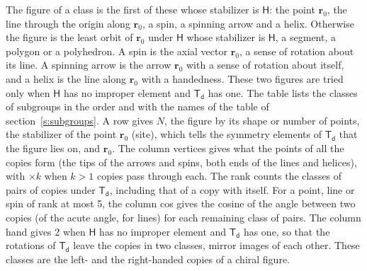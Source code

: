 \documentclass[10pt,a4paper]{article}
\numberwithin{equation}{section}
\newcommand{\grp}[1]{\mathsf{#1}}
\newcommand{\pointr}{\mathbf{r}}
\begin{document}
\leavevmode\label{n:head.figure}The figure of a class is the first of these whose stabilizer is $\grp{H}$: the point $\pointr_0$, the line through the origin along $\pointr_0$, a spin, a spinning arrow and a helix. Otherwise the figure is the least orbit of $\pointr_0$ under $\grp{H}$ whose stabilizer is $\grp{H}$, a segment, a polygon or a polyhedron. A spin is the axial vector $\pointr_0$, a sense of rotation about its line. A spinning arrow is the arrow $\pointr_0$ with a sense of rotation about itself, and a helix is the line along $\pointr_0$ with a handedness. These two figures are tried only when $\grp{H}$ has no improper element and $\grp{T_{d}}$ has one. The table lists the classes of subgroups in the order and with the names of the table of section~\ref{s:subgroups}. \label{n:head.site}A row gives $N$, the figure by its shape or number of points, the stabilizer of the point $\pointr_0$ (site), which tells the symmetry elements of $\grp{T_{d}}$ that the figure lies on, and $\pointr_0$. \label{n:head.vertices}The column vertices gives what the points of all the copies form (the tips of the arrows and spins, both ends of the lines and helices), with ${\times}k$ when $k > 1$ copies pass through each. \label{n:head.rank}The rank counts the classes of pairs of copies under $\grp{T_{d}}$, including that of a copy with itself. \label{n:head.cos}For a point, line or spin of rank at most 5, the column cos gives the cosine of the angle between two copies (of the acute angle, for lines) for each remaining class of pairs. \label{n:head.hand}The column hand gives 2 when $\grp{H}$ has no improper element and $\grp{T_{d}}$ has one, so that the rotations of $\grp{T_{d}}$ leave the copies in two classes, mirror images of each other. These classes are the left- and the right-handed copies of a chiral figure.
\end{document}
